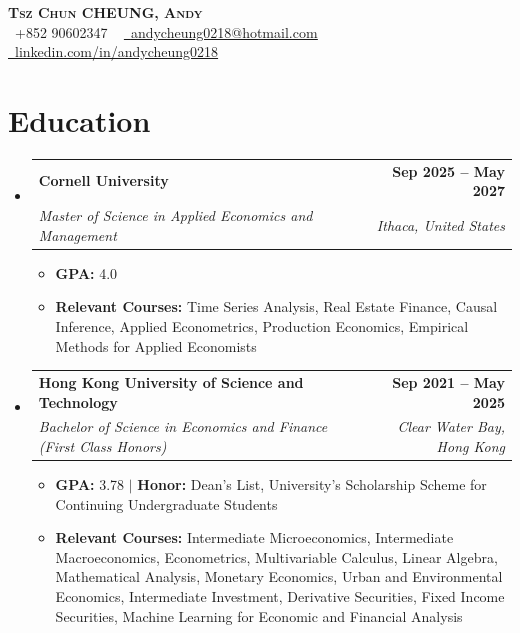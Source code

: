 \documentclass[letterpaper,11pt]{article}
\newcommand{\resumeItem}[1]{
  \item\small{
    {#1 \vspace{-2pt}}
  }
}
\newcommand{\resumeSubheading}[4]{
  \vspace{-2pt}\item
    \begin{tabularx}{\textwidth}[t]{>{\raggedright\arraybackslash}X r} %
      \textbf{#1} & \textbf{\small #2} \\
      \textit{\small#3} & \textit{\small #4} \\
    \end{tabularx}\vspace{-7pt} %
}
\newcommand{\resumeSubHeadingListStart}{\begin{itemize}[leftmargin=0.0in, label={}]}
\newcommand{\resumeSubHeadingListEnd}{\end{itemize}}
\newcommand{\resumeItemListStart}{\begin{itemize}}
\newcommand{\resumeItemListEnd}{\end{itemize}\vspace{-5pt}}
\begin{document}

\begin{center}
    \textbf{\Huge \scshape Tsz Chun CHEUNG, Andy} \\ \vspace{1pt}
    \small \raisebox{-0.1\height}\faPhone\ +852 90602347 ~ \href{andycheung0218@hotmail.com}{\raisebox{-0.2\height}\faEnvelope\  \underline{andycheung0218@hotmail.com}} ~ 
    \href{https://www.linkedin.com/in/andycheung0218/}{\raisebox{-0.2\height}\faLinkedin\ \underline{linkedin.com/in/andycheung0218}}  ~
    \vspace{-16pt}
\end{center}


\section{Education}
    \resumeSubHeadingListStart
        \resumeSubheading
            {Cornell University}{Sep 2025 -- May 2027}
            {Master of Science in Applied Economics and Management}{Ithaca, United States}
            \resumeItemListStart
                \resumeItem{\textbf{GPA:} 4.0}
                \resumeItem{\textbf{Relevant Courses:} Time Series Analysis, Real Estate Finance, Causal Inference, Applied Econometrics, Production Economics, Empirical Methods for Applied Economists}
            \resumeItemListEnd
        \vspace{-3pt}
        \resumeSubheading
            {Hong Kong University of Science and Technology}{Sep 2021 -- May 2025}
            {Bachelor of Science in Economics and Finance (First Class Honors)}{Clear Water Bay, Hong Kong}
            \resumeItemListStart
                \resumeItem{\textbf{GPA:} 3.78 $|$ \textbf{Honor:} Dean’s List, University's Scholarship Scheme for Continuing Undergraduate Students}
                \resumeItem{\textbf{Relevant Courses:} Intermediate Microeconomics, Intermediate Macroeconomics, Econometrics, Multivariable Calculus, Linear Algebra, Mathematical Analysis, Monetary Economics, Urban and Environmental Economics, Intermediate Investment, Derivative Securities, Fixed Income Securities, Machine Learning for Economic and Financial Analysis}
            \resumeItemListEnd
    \resumeSubHeadingListEnd
\vspace{-16pt}
\end{document}
